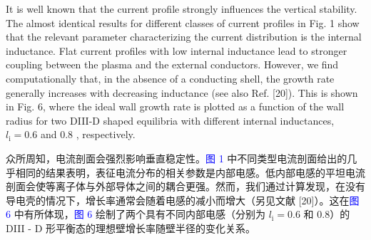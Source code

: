 \documentclass[utf8]{ctexart}
\newcommand\enzhbox[2]{
  	\quad\par \begin{paracol}{2} \colseprulecolor{black} 
  		\begin{spacing}{1.0}
  			\footnotesize  #1
  		\end{spacing}
  		\switchcolumn[1] 
  		#2
  	\end{paracol} \quad\par
  }
\begin{document}
\begin{sloppypar}
\enzhbox{  It is well known that the current profile strongly influences the vertical stability. The almost identical results for different classes of current profiles in Fig. 1 show that the relevant parameter characterizing the current distribution is the internal inductance. Flat current profiles with low internal inductance lead to stronger coupling between the plasma and the external conductors. However, we find computationally that, in the absence of a conducting shell, the growth rate generally increases with decreasing inductance (see also Ref. \textcolor{green!50!black}{[20]}). This is shown in Fig. 6, where the ideal wall growth rate is plotted as a function of the wall radius for two DIII-D shaped equilibria with different internal inductances, $l_{\mathrm{i}}=0.6$ and 0.8 , respectively.}{
众所周知，电流剖面会强烈影响垂直稳定性。\textcolor{blue}{图 1} 中不同类型电流剖面给出的几乎相同的结果表明，表征电流分布的相关参数是内部电感。低内部电感的平坦电流剖面会使等离子体与外部导体之间的耦合更强。然而，我们通过计算发现，在没有导电壳的情况下，增长率通常会随着电感的减小而增大（另见文献 \textcolor{green!50!black}{[20]}）。这在\textcolor{blue}{图 6} 中有所体现，\textcolor{blue}{图 6} 绘制了两个具有不同内部电感（分别为 $l_{\mathrm{i}} = 0.6$ 和 0.8）的 DIII - D 形平衡态的理想壁增长率随壁半径的变化关系。 }
  

\end{sloppypar}
\end{document}
